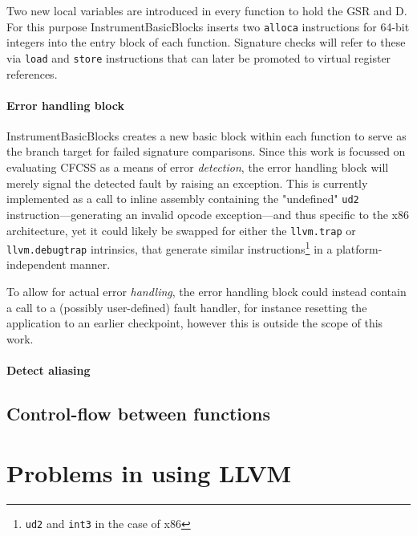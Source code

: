 Two new local variables are introduced in every function to hold the GSR and D.
For this purpose InstrumentBasicBlocks inserts two \texttt{alloca} instructions
for 64-bit integers into the entry block of each function.  Signature checks
will refer to these via \texttt{load} and \texttt{store} instructions that can
later be promoted to virtual register references.

\paragraph{Error handling block}

 InstrumentBasicBlocks creates a new
basic block within each function to serve as the branch target for failed
signature comparisons. Since this work is focussed on evaluating CFCSS as
a means of error \emph{detection}, the error handling block will merely signal
the detected fault by raising an exception.  This is currently implemented as
a call to inline assembly containing the "undefined" \texttt{ud2}
instruction—generating an invalid opcode exception—and thus specific to the x86
architecture, yet it could likely be swapped for either the \texttt{llvm.trap}
or \texttt{llvm.debugtrap} intrinsics, that generate similar
instructions\footnote{\texttt{ud2} and \texttt{int3} in the case of x86} in
a platform-independent manner.

To allow for actual error \emph{handling}, the error handling block could
instead contain a call to a (possibly user-defined) fault handler, for instance
resetting the application to an earlier checkpoint, however this is outside the
scope of this work.


\paragraph{Detect aliasing}

\subsection{Control-flow between functions}



\section{Problems in using LLVM}

